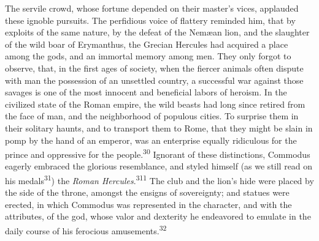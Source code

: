 The servile crowd, whose fortune depended on their master’s
vices, applauded these ignoble pursuits. The perfidious voice of
flattery reminded him, that by exploits of the same nature, by
the defeat of the Nemæan lion, and the slaughter of the wild boar
of Erymanthus, the Grecian Hercules had acquired a place among
the gods, and an immortal memory among men. They only forgot to
observe, that, in the first ages of society, when the fiercer
animals often dispute with man the possession of an unsettled
country, a successful war against those savages is one of the
most innocent and beneficial labors of heroism. In the civilized
state of the Roman empire, the wild beasts had long since retired
from the face of man, and the neighborhood of populous cities. To
surprise them in their solitary haunts, and to transport them to
Rome, that they might be slain in pomp by the hand of an emperor,
was an enterprise equally ridiculous for the prince and
oppressive for the people.\textsuperscript{30} Ignorant of these distinctions,
Commodus eagerly embraced the glorious resemblance, and styled
himself (as we still read on his medals\textsuperscript{31})
the \textit{Roman Hercules}.\textsuperscript{311}
The club and the lion’s hide were placed by the side of the
throne, amongst the ensigns of sovereignty; and statues were
erected, in which Commodus was represented in the character, and
with the attributes, of the god, whose valor and dexterity he
endeavored to emulate in the daily course of his ferocious
amusements.\textsuperscript{32}




